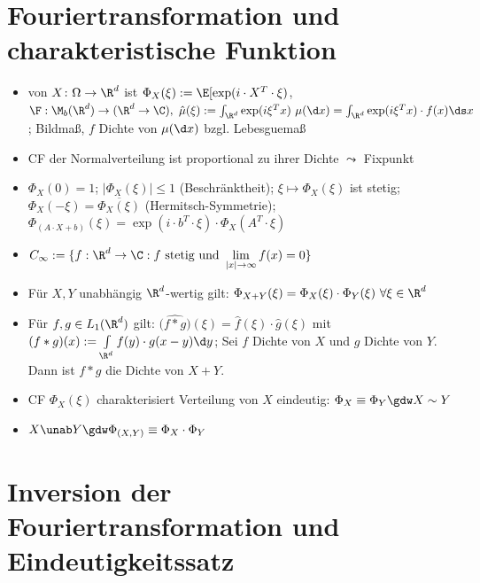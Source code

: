 	\section{Fouriertransformation und charakteristische Funktion}
	
	\begin{itemize}
		\item {} von $X\colon\Omega\to\R^d$ ist $\Phi_X(\xi):=\E[\exp(i\cdot X^T\cdot\xi)$,  $\F:\M_b(\R^d)\to(\R^d\to\C),~\hat{\mu}(\xi):=\int_{\R^d}\exp(i\xi^T x)~\mu(\d x)=\int_{\R^d}\exp(i\xi^T x)\cdot f(x)\ds x$; Bildmaß, $f$ Dichte von $\mu(\d x)$ bzgl. Lebesguemaß
		\item CF der Normalverteilung ist proportional zu ihrer Dichte $\leadsto$ Fixpunkt
		\item $\Phi_X(0)=1$; $|\Phi_X(\xi)|\leq1$ (Beschränktheit); $\xi\mapsto\Phi_X(\xi)$ ist stetig; $\Phi_X(-\xi)=\overline{\Phi_X(\xi)}$ (Hermitsch-Symmetrie); $\Phi_{(A\cdot X+b)}(\xi)=\exp(i\cdot b^T\cdot\xi)\cdot\Phi_X(A^T\cdot\xi)$
		\item $C_\infty:=\lbrace f:\R^d\to\C:f\text{ stetig und }\lim\limits_{|x|\to\infty}f(x)=0\rbrace$
		\item Für $X,Y$ unabhängig $\R^d$-wertig gilt: $\Phi_{X+Y}(\xi)=\Phi_X(\xi)\cdot\Phi_Y(\xi)~\forall\xi\in\R^d$
		\item Für $f,g\in L_1(\R^d)$ gilt: $\big(\widehat{f\ast g}\big)(\xi)=\hat{f}(\xi)\cdot\hat{g}(\xi)$
		mit $(f\ast g)(x):=\int\limits_{\R^d}f(y)\cdot g(x-y)\d y$;
		Sei $f$ Dichte von $X$ und $g$ Dichte von $Y$. Dann ist $f\ast g$ die Dichte von $X+Y$.
		\item {} CF $\Phi_X(\xi)$ charakterisiert Verteilung von $X$ eindeutig: $\Phi_X\equiv\Phi_Y\gdw X\sim Y$
		\item {} $X\unab Y\gdw\Phi_{(X,Y)}\equiv\Phi_X\cdot\Phi_Y$
	\end{itemize}
	
	\section{Inversion der Fouriertransformation und Eindeutigkeitssatz}
	
